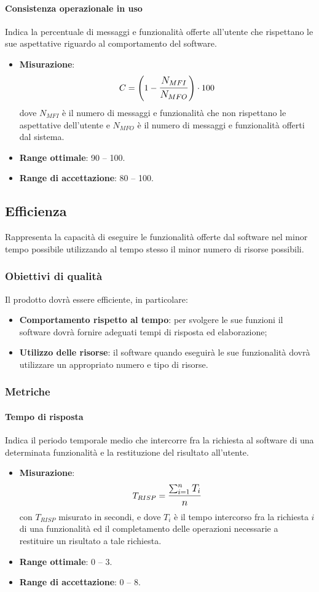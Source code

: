 \paragraph{Consistenza operazionale in uso}
Indica la percentuale di messaggi e funzionalità offerte all'utente che rispettano le sue aspettative riguardo al comportamento del software.
\begin{itemize}
	\item \textbf{Misurazione}: 
		$$C=\left(1-\mathlarger{\frac{N_{MFI}}{N_{MFO}}}\right) \cdot 100$$
	dove $N_{MFI}$ è il numero di messaggi e funzionalità che non rispettano le aspettative dell'utente e $N_{MFO}$ è il numero di messaggi e funzionalità offerti dal sistema.
	\item \textbf{Range ottimale}: 90 -- 100.
	\item \textbf{Range di accettazione}: 80 -- 100.
\end{itemize}

\subsection{Efficienza}
\label{efficienza}
Rappresenta la capacità di eseguire le funzionalità offerte dal software nel minor tempo possibile utilizzando al tempo stesso il minor numero di risorse possibili.

\subsubsection{Obiettivi di qualità}
Il prodotto dovrà essere efficiente, in particolare:
\begin{itemize}
\item \textbf{Comportamento rispetto al tempo}:  per svolgere le sue funzioni il software dovrà fornire adeguati tempi di risposta ed elaborazione;
\item \textbf{Utilizzo delle risorse}: il software quando eseguirà le sue funzionalità dovrà utilizzare un appropriato numero e tipo di risorse.
\end{itemize}

\subsubsection{Metriche}
\paragraph{Tempo di risposta}
Indica il periodo temporale medio che intercorre fra la richiesta al software di una determinata funzionalità e la restituzione del risultato all'utente.
\begin{itemize}
	\item \textbf{Misurazione}: 
		$$T_{RISP} = \mathlarger{\frac{\sum_{i=1}^{n} T_{i}}{n}}$$ 
	con $T_{RISP}$ misurato in secondi, e dove $T_{i}$ è il tempo intercorso fra la richiesta $i$ di una funzionalità ed il completamento delle operazioni necessarie a restituire un risultato a tale richiesta.
	\item \textbf{Range ottimale}: 0 -- 3.
	\item \textbf{Range di accettazione}: 0 -- 8.
\end{itemize}

